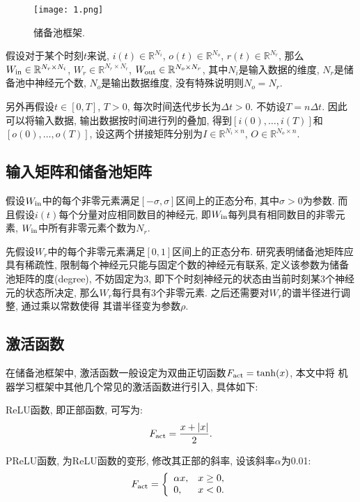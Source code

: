 \documentclass[notitlepage,cs4size,punct,oneside]{ctexrep}
\numberwithin{equation}{chapter}
\theoremstyle{mystyle}
\begin{document}
\begin{figure}[htbp]
    \centering
    \texttt{[image: 1.png]}
    \caption{储备池框架.}
\end{figure}

假设对于某个时刻$t$来说, 
$i(t)\in\mathbb{R}^{N_i}$, 
$o(t)\in\mathbb{R}^{N_o}$, $r(t)\in\mathbb{R}^{N_r}$, 
那么$W_{\textmd{in}}\in\mathbb{R}^{{N_r}\times{N_i}}$, 
$W_{r}\in\mathbb{R}^{{N_r}\times{N_r}}$,
$W_{\textmd{out}}\in\mathbb{R}^{{N_o}\times{N_r}}$,
其中$N_i$是输入数据的维度, $N_r$是储备池中神经元个数, 
$N_o$是输出数据维度, 没有特殊说明则$N_o=N_r$. 

另外再假设$t\in[0, T]$, $T>0$, 每次时间迭代步长为$\Delta t>0$. 不妨设$T=n\Delta t$. 
因此可以将输入数据, 输出数据按时间进行列的叠加, 得到$[i(0), \dots, i(T)]$和$[o(0), \dots, o(T)]$, 
设这两个拼接矩阵分别为$I\in\mathbb{R}^{{N_i}\times n}$, $O\in\mathbb{R}^{{N_o}\times{n}}$.


\subsection{输入矩阵和储备池矩阵}
假设$W_{\textmd{in}}$中的每个非零元素满足$[-\sigma, \sigma]$区间上的正态分布, 其中$\sigma>0$为参数. 
而且假设$i(t)$每个分量对应相同数目的神经元, 即$W_{\textmd{in}}$每列具有相同数目的非零元素, 
$W_{\textmd{in}}$中所有非零元素个数为$N_r$. 

先假设$W_{r}$中的每个非零元素满足$[0, 1]$区间上的正态分布. 
研究表明储备池矩阵应具有稀疏性\cite{AGAP}, 限制每个神经元只能与固定个数的神经元有联系, 
定义该参数为储备池矩阵的度(degree), 不妨固定为3, 即下个时刻神经元的状态由当前时刻某3个神经元的状态所决定, 
那么$W_{r}$每行具有3个非零元素. 之后还需要对$W_r$的谱半径进行调整, 通过乘以常数使得
其谱半径变为参数$\rho$.

\subsection{激活函数}

在储备池框架中, 激活函数一般设定为双曲正切函数$F_{\textmd{act}}=\tanh(x)$, 本文中将
机器学习框架中其他几个常见的激活函数进行引入, 具体如下:

ReLU函数, 即正部函数, 可写为:
$$
    F_{\textmd{act}} = \frac{x + |x|}{2}.
$$

PReLU函数, 为ReLU函数的变形, 修改其正部的斜率, 设该斜率$\alpha$为0.01:
$$
    F_{\textmd{act}} = \left\{\begin{array}{ll}
    \alpha x, & x\geq0,\\
    0, & x<0.
    \end{array}\right.
$$
\end{document}
